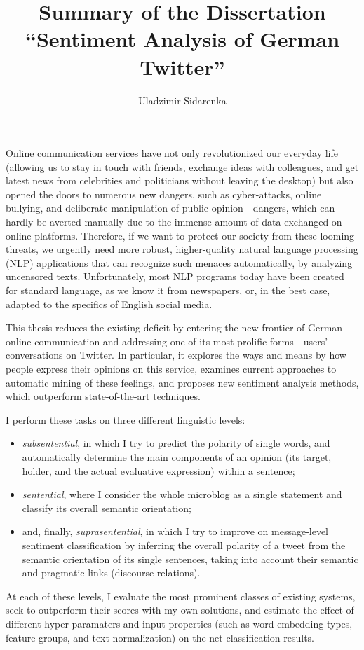 \documentclass[11pt]{article}
\author{Uladzimir Sidarenka}
\title{  {\large Summary of the Dissertation}\\[0.5em]
  {\Large ``Sentiment Analysis of German Twitter''}}
\date{\vspace{-3ex}}
\begin{document}
\maketitle

Online communication services have not only revolutionized our
everyday life (allowing us to stay in touch with friends, exchange
ideas with colleagues, and get latest news from celebrities and
politicians without leaving the desktop) but also opened the doors to
numerous new dangers, such as cyber-attacks, online bullying, and
deliberate manipulation of public opinion---dangers, which can hardly
be averted manually due to the immense amount of data exchanged on
online platforms.  Therefore, if we want to protect our society from
these looming threats, we urgently need more robust, higher-quality
natural language processing (NLP) applications that can recognize such
menaces automatically, by analyzing uncensored texts.  Unfortunately,
most NLP programs today have been created for standard language, as we
know it from newspapers, or, in the best case, adapted to the
specifics of English social media.

This thesis reduces the existing deficit by entering the new frontier
of German online communication and addressing one of its most prolific
forms---users' conversations on Twitter.  In particular, it explores
the ways and means by how people express their opinions on this
service, examines current approaches to automatic mining of these
feelings, and proposes new sentiment analysis methods, which
outperform state-of-the-art techniques.

I perform these tasks on three different linguistic levels:
\begin{itemize}
  \item\emph{subsentential}, in which I try to predict the polarity of
    single words, and automatically determine the main components of
    an opinion (its target, holder, and the actual evaluative
    expression) within a sentence;

  \item\emph{sentential}, where I consider the whole microblog as a
    single statement and classify its overall semantic orientation;

  \item and, finally, \emph{suprasentential}, in which I try to
    improve on message-level sentiment classification by inferring the
    overall polarity of a tweet from the semantic orientation of its
    single sentences, taking into account their semantic and pragmatic
    links (discourse relations).
\end{itemize}
At each of these levels, I evaluate the most prominent classes of
existing systems, seek to outperform their scores with my own
solutions, and estimate the effect of different hyper-paramaters and
input properties (such as word embedding types, feature groups, and
text normalization) on the net classification results.
\end{document}
